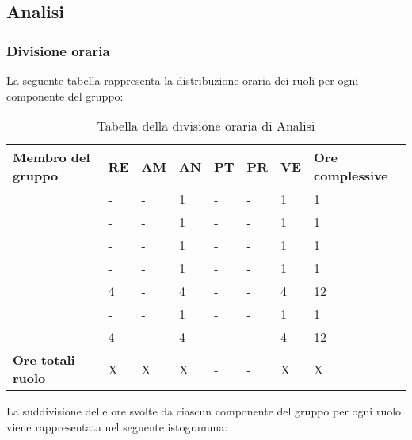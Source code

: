 \subsection{Analisi}

\subsubsection{Divisione oraria}
La seguente tabella rappresenta la distribuzione oraria dei ruoli per ogni componente del gruppo:
{

\renewcommand{\arraystretch}{2}
\begin{longtable}[h!] { C{4cm} C{1cm} C{1cm} C{1cm} C{1cm} C{1cm} C{1cm} C{3cm}}
\caption{Tabella della divisione oraria di Analisi}	\\
\rowcolor{\primaryColor}

\textcolor{\secondaryColor}{\textbf{Membro del gruppo}} & 
\textcolor{\secondaryColor}{\textbf{RE}} & 
\textcolor{\secondaryColor}{\textbf{AM}} & 
\textcolor{\secondaryColor}{\textbf{AN}} & 
\textcolor{\secondaryColor}{\textbf{PT}} & 
\textcolor{\secondaryColor}{\textbf{PR}} & 
\textcolor{\secondaryColor}{\textbf{VE}} & 
\textcolor{\secondaryColor}{\textbf{Ore complessive}}\\	
\endhead

\AD{}                     &  - &  - &  1 & - & - & 1 & 1 \\
\AT{}                     &  - &  - &  1 & - & - & 1 & 1 \\
\AW{}                     &  - &  - &  1 & - & - & 1 & 1 \\
\EC{}                     &  - &  - &  1 & - & - & 1 & 1 \\
\EM{}                     &  4 &  - &  4 & - & - & 4 & 12 \\
\FP{}                     &  - &  - &  1 & - & - & 1 & 1 \\
\GG{}                     &  4 &  - &  4 & - & - & 4 & 12 \\
\textbf{Ore totali ruolo} & X & X & X & - & - & X & X \\

\end{longtable}
}
La suddivisione delle ore svolte da ciascun componente del gruppo per ogni ruolo viene rappresentata nel seguente istogramma:
